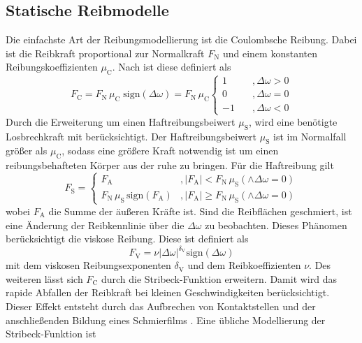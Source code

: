 \subsection{Statische Reibmodelle}
Die einfachste Art der Reibungsmodellierung ist die Coulombsche Reibung. Dabei ist die Reibkraft proportional zur Normalkraft $F_\mathrm{N}$ und einem konstanten Reibungskoeffizienten $\mu_\mathrm{C}$. Nach \cite{Schroeder.2015} ist diese definiert als
\begin{equation}
F_\mathrm{C} = F_\mathrm{N}\,\mu_\mathrm{C}\;\mathrm{sign}(\Delta \omega)=F_\mathrm{N}\,\mu_\mathrm{C}\begin{cases}1&\quad,\Delta \omega>0\\0&\quad,\Delta \omega=0\\-1&\quad,\Delta \omega<0 \end{cases}
\end{equation}
Durch die Erweiterung um einen Haftreibungsbeiwert $\mu_\mathrm{S}$, wird eine benötigte Losbrechkraft mit berücksichtigt. Der Haftreibungsbeiwert $\mu_\mathrm{S}$ ist im Normalfall größer als $\mu_\mathrm{C}$, sodass eine größere Kraft notwendig ist um einen reibungsbehafteten Körper aus der ruhe zu bringen. Für die Haftreibung gilt
\begin{equation}
F_\mathrm{S} = \begin{cases}F_\mathrm{A}&,\vert F_\mathrm{A}\vert < F_\mathrm{N}\,\mu_\mathrm{S} (\wedge\Delta \omega = 0)
\\ F_\mathrm{N}\,\mu_\mathrm{S}\,\mathrm{sign}(F_\mathrm{A})&,\vert F_\mathrm{A}\vert \geq F_\mathrm{N}\,\mu_\mathrm{S} (\wedge\Delta \omega = 0) \end{cases}
\end{equation}
wobei $F_\mathrm{A}$ die Summe der äußeren Kräfte ist. Sind die Reibflächen geschmiert, ist eine Änderung der Reibkennlinie über  die $\Delta \omega$ zu beobachten. Dieses Phänomen berücksichtigt die viskose Reibung. Diese ist definiert als
\begin{equation}
F_\mathrm{V}=\nu\vert\Delta\omega\vert^{\delta_\mathrm{V}}\mathrm{sign}(\Delta\omega)
\end{equation}
mit dem viskosen Reibungsexponenten $\delta_\mathrm{V}$ und dem Reibkoeffizienten $\nu$. Des weiteren lässt sich $F_\mathrm{C}$ durch die Stribeck-Funktion erweitern. Damit wird das rapide Abfallen der Reibkraft bei kleinen Geschwindigkeiten berücksichtigt. Dieser Effekt entsteht durch das Aufbrechen von Kontaktstellen und der anschließenden Bildung eines Schmierfilms \cite{Stribeck.1903}. Eine übliche Modellierung der Stribeck-Funktion ist
